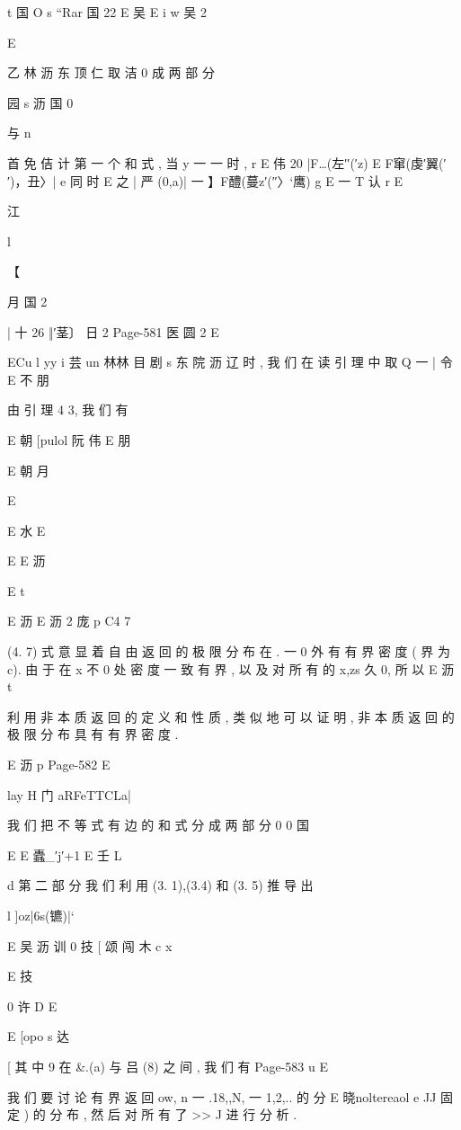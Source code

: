{t
国 O
s “Rar
国 22 E 吴
E
i w
吴
2

E

乙 林 沥 东 顶 仁 取 洁 0
成 两 部 分

园 s 沥
国 0

与
n

首 免 佶 计 第 一 个 和 式 , 当 y 一 一 时 , r
E 伟
20 |F…(左′′(′z) E F窜(虔′翼(′′)，丑〉|
e
同 时
E
之 | 严 (0,a)| 一 】F醴(蔓z′(″〉`鹰) g
E 一 T 认
r
E

江

l

【

月
国 2

| 十 26 ‖′茎〕 日 2
Page-581
医 圆 2 E

ECu l yy i 芸
un 林林 目 剧
s 东 院 沥 辽
时 , 我 们 在 读 引 理 中 取 Q 一 | 令
E 不 朋

由 引 理 4 3, 我 们 有

E 朝
[pulol 阮 伟
E 朋

E 朝 月

E

E 水
E

E
E 沥

E
t

E 沥
E 沥 2 庞
p C4 7

(4. 7) 式 意 显 着 自 由 返 回 的 极 限 分 布 在 . 一 0 外 有 有 界 密 度 ( 界 为
c). 由 于 在 x 不 0 处 密 度 一 致 有 界 , 以 及 对 所 有 的 x,zs 久 0, 所 以
E 沥 t

利 用 非 本 质 返 回 的 定 义 和 性 质 , 类 似 地 可 以 证 明 , 非 本 质 返 回
的 极 限 分 布 具 有 有 界 密 度 .

E 沥 p
Page-582
E

lay H 门 aRFeTTCLa|

我 们 把 不 等 式 有 边 的 和 式 分 成 两 部 分
0 0
国

E E 蠹_′j′+1
E
壬 L

d
第 二 部 分 我 们 利 用 (3. 1),(3.4) 和 (3. 5) 推 导 出

l ]oz|6s(镳)|`

E 吴 沥 训
0 技 [ 颂 闯 木 c
x

E 技

0
许
D E

E
[opo s 达

[
其 中 9 在 &.(a) 与 吕 (8) 之 间 , 我 们 有
Page-583
u E

我 们 要 讨 论 有 界 返 回 {ow}, n 一 .18,,N, 一 1,2,.. 的 分
E 晓noltereaol e
JJ 固 定 ) 的 分 布 , 然 后 对 所 有 了 >> J 进 行 分 析 .

}
